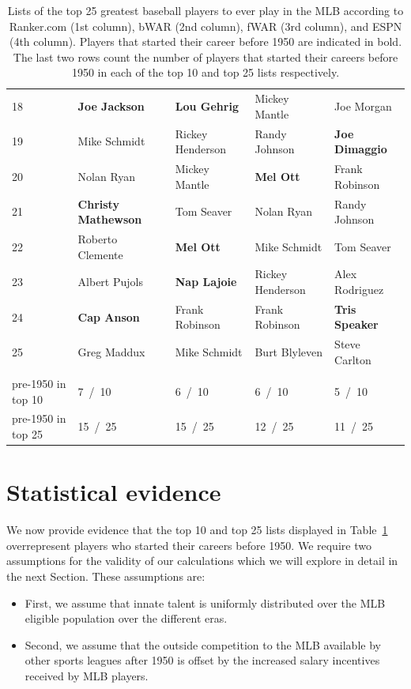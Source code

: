 \documentclass[11pt]{article}\usepackage[]{graphicx}\usepackage[]{color}
\begin{document}
\begin{table}[h!]
\begin{center}
\begin{tabular}{lllll}
18 & {\bf Joe Jackson}       & {\bf Lou Gehrig}     & Mickey Mantle        & Joe Morgan           \\
19 & Mike Schmidt            & Rickey Henderson     & Randy Johnson        & {\bf Joe Dimaggio}   \\
20 & Nolan Ryan              & Mickey Mantle        & {\bf Mel Ott}        & Frank Robinson       \\
21 & {\bf Christy Mathewson} & Tom Seaver           & Nolan Ryan           & Randy Johnson        \\
22 & Roberto Clemente        & {\bf Mel Ott}        & Mike Schmidt         & Tom Seaver           \\
23 & Albert Pujols           & {\bf Nap Lajoie}     & Rickey Henderson     & Alex Rodriguez       \\
24 & {\bf Cap Anson}         & Frank Robinson       & Frank Robinson       & {\bf Tris Speaker}   \\
25 & Greg Maddux             & Mike Schmidt         & Burt Blyleven        & Steve Carlton        \\
 & & & & \\
pre-1950 in top 10 &   7 \,/\, 10  &   6 \,/\, 10  &   6 \,/\, 10  &   5 \,/\, 10  \\
pre-1950 in top 25 &  15 \,/\, 25  &  15 \,/\, 25  &  12 \,/\, 25  &  11 \,/\, 25  \\
\hline
\end{tabular}
\end{center}
\caption{Lists of the top 25 greatest baseball players to ever play in the 
  MLB according to Ranker.com (1st column), bWAR (2nd column), 
  fWAR (3rd column), and ESPN (4th column). Players that started their career 
  before 1950 are indicated in bold. The last two rows count the number of players 
  that started their careers before 1950 in each of the top 10 and top 25 lists 
  respectively.}
\label{top25}
\end{table}



\section{Statistical evidence}
\label{sec:Stats}

We now provide evidence that the top 10 and top 25 lists displayed in 
Table~\ref{top25} overrepresent players who started their careers 
before 1950.  We require two assumptions for the validity of our calculations 
which we will explore in detail in the next Section.  These assumptions are: 
\begin{itemize}
\item First, we assume that innate talent is uniformly distributed over the 
  MLB eligible population over the different eras.
\item Second, we assume that the outside competition to the MLB available by 
  other sports leagues after 1950 is offset by the increased salary 
  incentives received by MLB players.
\end{itemize}
\end{document}
